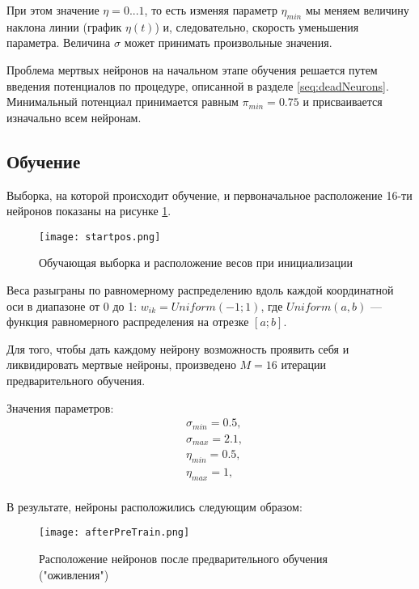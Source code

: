 При этом значение $\eta = 0 ... 1$, то есть изменяя параметр $\eta_{min}$ мы меняем величину наклона линии (график $\eta (t)$) и, следовательно, скорость уменьшения параметра. Величина $\sigma$ может принимать произвольные значения.

Проблема мертвых нейронов на начальном этапе обучения решается путем введения потенциалов по процедуре, описанной в разделе \ref{seq:deadNeurons}. 
Минимальный потенциал принимается равным $\pi_{min} = 0.75$ и присваивается изначально всем нейронам.

\subsection{Обучение}
Выборка, на которой происходит обучение, и первоначальное расположение 16-ти нейронов показаны на рисунке  \ref{img:startpos}.

\begin{figure}[H]
\centering
\texttt{[image: startpos.png]}
\caption{Обучающая выборка и расположение весов при инициализации}
\label{img:startpos}
\end{figure}

Веса разыграны по равномерному распределению вдоль каждой координатной оси в диапазоне от 0 до 1: $w_{ik} = Uniform(-1;1)$, где $Uniform(a, b)$ --- функция равномерного распределения на отрезке $[a;b]$.

Для того, чтобы дать каждому нейрону возможность проявить себя и ликвидировать мертвые нейроны, произведено $M = 16$ итерации предварительного обучения. 

Значения параметров:
\begin{equation}
	\begin{aligned}
	 &	\sigma_{min} = 0.5,  \\ 
	 &	\sigma_{max} = 2.1, \\	
	 &	\eta_{min} = 0.5,  \\ 
	 &	\eta_{max} = 1, \\
	\end{aligned}
\end{equation} 

В результате, нейроны расположились следующим образом:

\begin{figure}[H]
\centering
\texttt{[image: afterPreTrain.png]}
\caption{Расположение нейронов после предварительного обучения ("оживления")}
\label{img:afterPreTrain}
\end{figure}

